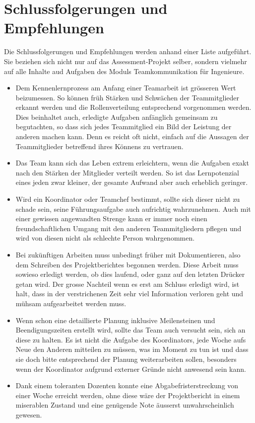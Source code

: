 \chapter{Schlussfolgerungen und Empfehlungen}
Die Schlussfolgerungen und Empfehlungen werden anhand einer Liste aufgeführt. Sie beziehen sich nicht nur auf das Assessment-Projekt selber, sondern vielmehr auf alle Inhalte aud Aufgaben des Moduls Teamkommunikation für Ingenieure. 

\begin{itemize}
\item Dem Kennenlernprozess am Anfang einer Teamarbeit ist grösseren Wert beizumessen. So können früh Stärken und Schwächen der Teammitglieder erkannt werden und die Rollenverteilung entsprechend vorgenommen werden. Dies beinhaltet auch, erledigte Aufgaben anfänglich gemeinsam zu begutachten, so dass sich jedes Teammitglied ein Bild der Leistung der anderen machen kann. Denn es reicht oft nicht, einfach auf die Aussagen der Teammitglieder betreffend ihres Könnens zu vertrauen.
\item Das Team kann sich das Leben extrem erleichtern, wenn die Aufgaben exakt nach den Stärken der Mitglieder verteilt werden. So ist das Lernpotenzial eines jeden zwar kleiner, der gesamte Aufwand aber auch erheblich geringer.
\item Wird ein Koordinator oder Teamchef bestimmt, sollte sich dieser nicht zu schade sein, seine Führungsaufgabe auch aufrichtig wahrzunehmen. Auch mit einer gewissen angewandten Strenge kann er immer noch einen freundschaftlichen Umgang mit den anderen Teammitgliedern pflegen und wird von diesen nicht als schlechte Person wahrgenommen.
\item Bei zukünftigen Arbeiten muss unbedingt früher mit Dokumentieren, also dem Schreiben des Projektberichtes begonnen werden. Diese Arbeit muss sowieso erledigt werden, ob dies laufend, oder ganz auf den letzten Drücker getan wird. Der grosse Nachteil wenn es erst am Schluss erledigt wird, ist halt, dass in der verstrichenen Zeit sehr viel Information verloren geht und mühsam aufgearbeitet werden muss.
\item Wenn schon eine detaillierte Planung inklusive Meilensteinen und Beendigungszeiten erstellt wird, sollte das Team auch versucht sein, sich an diese zu halten. Es ist nicht die Aufgabe des Koordinators, jede Woche aufs Neue den Anderen mitteilen zu müssen, was im Moment zu tun ist und dass sie doch bitte entsprechend der Planung weiterarbeiten sollen, besonders wenn der Koordinator aufgrund externer Gründe nicht anwesend sein kann.
\item Dank einem toleranten Dozenten konnte eine Abgabefristerstreckung von einer Woche erreicht werden, ohne diese wäre der Projektbericht in einem miserablen Zustand und eine genügende Note äusserst unwahrscheinlich gewesen.
\end{itemize}

